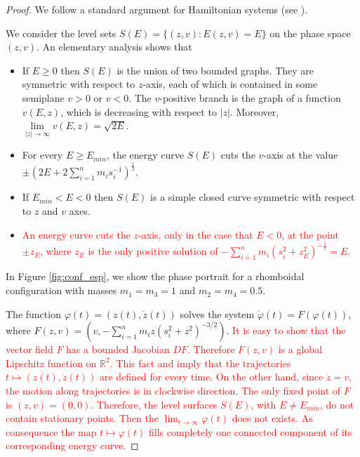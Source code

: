 \documentclass[smallcondensed]{svjour3}
\newcommand{\rr}{\mathbb{R}}
\begin{document}
\begin{proof}
We follow a standard argument for Hamiltonian systems (see \cite{A}).

We consider the level sets $S(E)=\{(z,v):E(z,v)=E\}$ on the phase space $(z,v)$. An elementary analysis shows that
\begin{itemize}
 \item If $E\geq 0$ then $S(E)$ is the union of two bounded graphs. They are symmetric with respect to $z$-axis, each of which is contained  in some semiplane $v> 0$ or $v<0$. The $v$-positive branch is the graph of a function $v(E,z)$, which  is decreasing with respect to $|z|$. Moreover, $\lim\limits_{|z|\to \infty}v(E,z)=\sqrt{2E}$.

 \item For every $E\geq E_{min}$, the energy curve $S(E)$ cuts the $v$-axis at the value $\pm(2E+2\sum_{i=1}^n m_is_i^{-1})^{\frac12}$.

 \item If $E_{min}<E<0$ then $S(E)$ is a simple closed curve symmetric with respect to $z$ and $v$ axes.

 \item  \textcolor{red}{An energy curve cuts the $z$-axis, only in the case that $E<0$, at the point $\pm z_{E}$,  where $z_E$ is the only positive solution of $-\sum_{i=1}^n m_i (s_i^2+z_{E}^2)^{-\frac12}=E$.}
\end{itemize}

In Figure  \ref{fig:conf_esp}, we show the phase portrait for a rhomboidal configuration with masses $m_1=m_3=1$ and $m_2=m_4=0.5$.

The function $\varphi(t)=(z(t),\dot{z}(t))$ solves the system $\dot{\varphi}(t)=F(\varphi(t))$, where \linebreak $F(z,v)=(v,-\sum_{i=1}^{n}m_iz (s_i^2+z^2)^{-3/2})$. \textcolor{red}{It is easy to show that the vector field $F$ has a bounded Jacobian  $D F$. Therefore $F(z,v)$ is a global Lipschitz function on $\rr^2$. This fact and \cite[Th. B.1]{betounes2009differential} imply that the trajectories $t\mapsto (z(t),\dot{z}(t))$ are defined for every time. On the other hand, since $\dot{z}=v$, the motion along trajectories is in clockwise direction. The only fixed point of $F$ is $(z,v)=(0,0)$.  Therefore, the level surfaces $S(E)$, with $E\neq E_{min}$, do not contain stationary points. Then the $\lim_{t\to\infty}\varphi(t)$ does not exists.  As consequence the map $t\mapsto \varphi(t)$    fills completely one connected component of its corresponding   energy curve.}


\end{proof}
\end{document}
